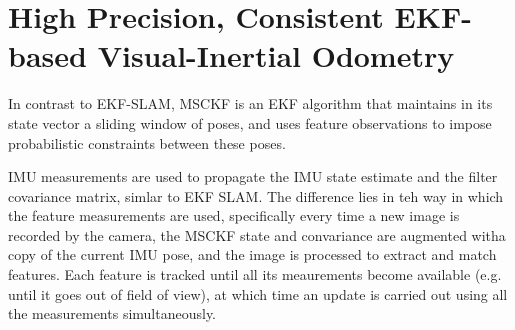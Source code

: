 \section{High Precision, Consistent EKF-based Visual-Inertial Odometry}

In contrast to EKF-SLAM, MSCKF is an EKF algorithm that maintains in its
state vector a sliding window of poses, and uses feature observations to
impose probabilistic constraints between these poses.

IMU measurements are used to propagate the IMU state estimate and the
filter covariance matrix, simlar to EKF SLAM. The difference lies in teh
way in which the feature measurements are used, specifically every time
a new image is recorded by the camera, the MSCKF state and convariance are
augmented witha copy of the current IMU pose, and the image is processed
to extract and match features. Each feature is tracked until all its
meaurements become available (e.g. until it goes out of field of view), at
which time an update is carried out using all the measurements
simultaneously.
